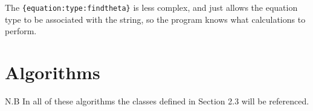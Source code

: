 The \texttt{\{equation:type:findtheta\}} is less complex, and just allows the equation type to be associated with the string, so the program knows what calculations to perform.
\section{Algorithms}
N.B In all of these algorithms the classes defined in Section 2.3 will be referenced.
